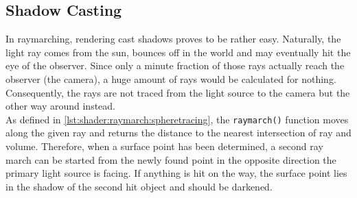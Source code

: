 \clearpage
\subsection{Shadow Casting}
In \gls{raymarching}, rendering cast shadows  proves to be rather easy. Naturally, the light ray comes from the sun, bounces off in the world and may eventually hit the eye of the observer.
Since only a minute fraction of those rays actually reach the observer (the camera), a huge amount of rays would be calculated for nothing.
Consequently, the rays are not traced from the light source to the camera but the other way around instead.
\\
As defined in \autoref{lst:shader:raymarch:spheretracing}, the \lstinline[language=HLSL]{raymarch()} function moves along the given ray and returns the distance to the nearest intersection of ray and volume.
Therefore, when a surface point has been determined, a second ray march can be started from the newly found point in the opposite direction the primary light source is facing. If anything is hit on the way, the surface point lies in the shadow of the second hit object and should be darkened.

\begin{figure}[H]
    \centering
    \label{img:tikz:rendering:shadowcasting}
\end{figure}

